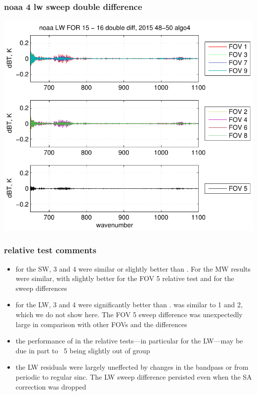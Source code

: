 \documentclass[11pt]{beamer}
\begin{document}
\begin{frame}
\frametitle{noaa 4 lw sweep double difference}
\begin{center}
  \includegraphics[scale=0.7]{figures/noaa_LW_sfil_2015_48-50_algo4.pdf}
\end{center}
\end{frame}
\begin{frame}
\frametitle{relative test comments}

\begin{itemize}

  \item for the SW, {\noaa} 3 and 4 were similar or slightly better
    than {\ccast}.  For the MW results were similar, with {\ccast}
    slightly better for the FOV 5 relative test and {\noaa} for the
    sweep differences

  \item for the LW, {\noaa} 3 and 4 were significantly better than
    {\ccast}.  {\ccast} was similar to {\noaa} 1 and 2, which we do
    not show here.  The {\ccast} FOV 5 sweep difference was
    unexpectedly large in comparison with other FOVs and the {\noaa}
    differences

  \item the performance of {\ccast} in the relative tests---in
    particular for the LW---may be due in part to {\fov}~5 being
    slightly out of group

  \item the {\ccast} LW residuals were largely uneffected by changes
    in the bandpass or from periodic to regular sinc.  The LW sweep
    difference persisted even when the SA correction was dropped

\end{itemize}

\end{frame}
\end{document}
